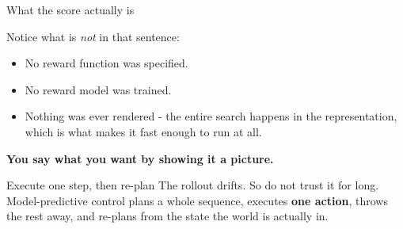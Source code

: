 \documentclass[aspectratio=169]{beamer}
\begin{document}
\begin{frame}{What the score actually is}
  \small
  \begin{center}
  \end{center}
  \vskip 12pt
  Notice what is \emph{not} in that sentence:
  \begin{itemize}\small
    \item No reward function was specified.
    \item No reward model was trained.
    \item Nothing was ever rendered - the entire search happens in the representation,
      which is what makes it fast enough to run at all.
  \end{itemize}
  \vskip 10pt
  \begin{center}
    \small\color{armred}\textbf{You say what you want by showing it a picture.}
  \end{center}
\end{frame}


\begin{frame}{Execute one step, then re-plan}
  \small
  The rollout drifts. So do not trust it for long.
  \vskip 8pt
  Model-predictive control plans a whole sequence, executes \textbf{one action}, throws the
  rest away, and re-plans from the state the world is actually in.
  \vskip 10pt
  \begin{center}
  \end{center}
\end{frame}
\end{document}
